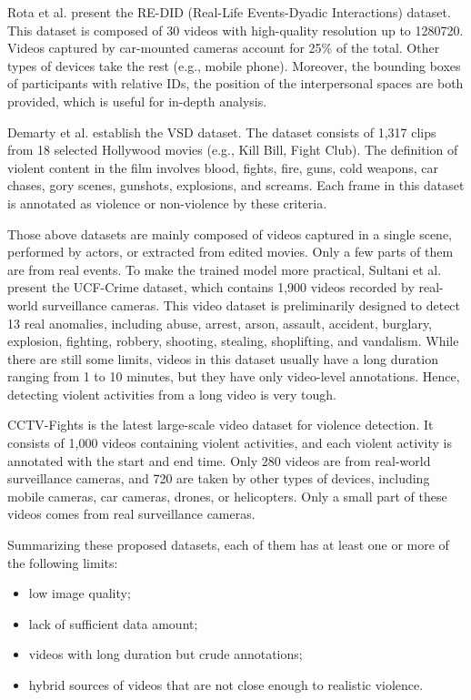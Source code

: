 \documentclass[a4paper,conference]{IEEEtran}
\begin{document}
Rota et al. \cite{redid} present the RE-DID (Real-Life Events-Dyadic Interactions) dataset. This dataset is composed of 30 videos with high-quality resolution up to 1280720.  Videos captured by car-mounted cameras account for 25\% of the total. Other types of devices take the rest (e.g., mobile phone). Moreover, the bounding boxes of participants with relative IDs, the position of the interpersonal spaces are both provided, which is useful for in-depth analysis.

Demarty et al. \cite{vsd} establish the VSD dataset. The dataset consists of 1,317 clips from 18 selected Hollywood movies (e.g., Kill Bill, Fight Club). The definition of violent content in the film involves blood, fights, fire, guns, cold weapons, car chases, gory scenes, gunshots, explosions, and screams. Each frame in this dataset is annotated as violence or non-violence by these criteria.

Those above datasets are mainly composed of videos captured in a single scene, performed by actors, or extracted from edited movies. Only a few parts of them are from real events. To make the trained model more practical, Sultani et al. \cite{ucf-crime} present the UCF-Crime dataset, which contains 1,900 videos recorded by real-world surveillance cameras. This video dataset is preliminarily designed to detect 13 real anomalies, including abuse, arrest, arson, assault, accident, burglary, explosion, fighting, robbery, shooting, stealing, shoplifting, and vandalism. While there are still some limits, videos in this dataset usually have a long duration ranging from 1 to 10 minutes, but they have only video-level annotations. Hence, detecting violent activities from a long video is very tough.

CCTV-Fights \cite{cctv_fight} is the latest large-scale video dataset for violence detection. It consists of 1,000 videos containing violent activities, and each violent activity is annotated with the start and end time. Only 280 videos are from real-world surveillance cameras, and 720 are taken by other types of devices, including mobile cameras, car cameras, drones, or helicopters. Only a small part of these videos comes from real surveillance cameras.

Summarizing these proposed datasets, each of them has at least one or more of the following limits:
\begin{itemize}
  \item low image quality;
  \item lack of sufficient data amount;
  \item videos with long duration but crude annotations;
  \item hybrid sources of videos that are not close enough to realistic violence.
\end{itemize}
\end{document}

